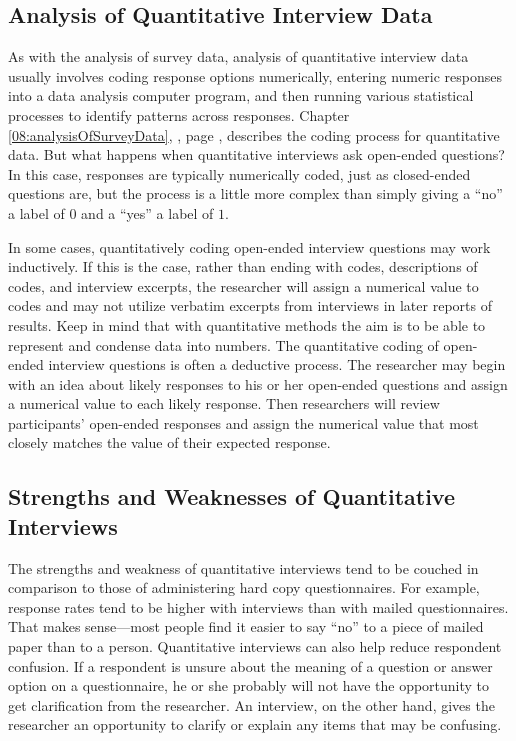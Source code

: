 \subsection{Analysis of Quantitative Interview Data}

As with the analysis of survey data, analysis of quantitative interview data usually involves coding response options numerically, entering numeric responses into a data analysis computer program, and then running various statistical processes to identify patterns across responses. Chapter \ref{08:analysisOfSurveyData}, , page \pageref{08:analysisOfSurveyData}, describes the coding process for quantitative data. But what happens when quantitative interviews ask open-ended questions? In this case, responses are typically numerically coded, just as closed-ended questions are, but the process is a little more complex than simply giving a ``no'' a label of $ 0 $ and a ``yes'' a label of $ 1 $.

In some cases, quantitatively coding open-ended interview questions may work inductively. If this is the case, rather than ending with codes, descriptions of codes, and interview excerpts, the researcher will assign a numerical value to codes and may not utilize verbatim excerpts from interviews in later reports of results. Keep in mind that with quantitative methods the aim is to be able to represent and condense data into numbers. The quantitative coding of open-ended interview questions is often a deductive process. The researcher may begin with an idea about likely responses to his or her open-ended questions and assign a numerical value to each likely response. Then researchers will review participants' open-ended responses and assign the numerical value that most closely matches the value of their expected response.

\subsection{Strengths and Weaknesses of Quantitative Interviews}

The strengths and weakness of quantitative interviews tend to be couched in comparison to those of administering hard copy questionnaires. For example, response rates tend to be higher with interviews than with mailed questionnaires. That makes sense---most people find it easier to say ``no'' to a piece of mailed paper than to a person. Quantitative interviews can also help reduce respondent confusion. If a respondent is unsure about the meaning of a question or answer option on a questionnaire, he or she probably will not have the opportunity to get clarification from the researcher. An interview, on the other hand, gives the researcher an opportunity to clarify or explain any items that may be confusing.

